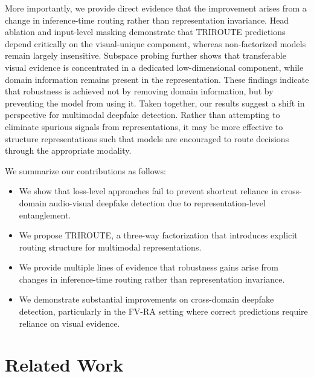 \documentclass{article}
\begin{document}
More importantly, we provide direct evidence that the improvement arises from a change in inference-time routing rather than representation invariance. Head ablation and input-level masking demonstrate that TRIROUTE predictions depend critically on the visual-unique component, whereas non-factorized models remain largely insensitive. Subspace probing further shows that transferable visual evidence is concentrated in a dedicated low-dimensional component, while domain information remains present in the representation. These findings indicate that robustness is achieved not by removing domain information, but by preventing the model from using it.
Taken together, our results suggest a shift in perspective for multimodal deepfake detection. Rather than attempting to eliminate spurious signals from representations, it may be more effective to structure representations such that models are encouraged to route decisions through the appropriate modality.

We summarize our contributions as follows:
\begin{itemize}
    \item We show that loss-level approaches fail to prevent shortcut reliance in cross-domain audio-visual deepfake detection due to representation-level entanglement.
    
    \item We propose TRIROUTE, a three-way factorization that introduces explicit routing structure for multimodal representations.
    
    \item We provide multiple lines of evidence that robustness gains arise from changes in inference-time routing rather than representation invariance.
    
    \item We demonstrate substantial improvements on cross-domain deepfake detection, particularly in the FV-RA setting where correct predictions require reliance on visual evidence.
\end{itemize}


\section{Related Work}
\end{document}
